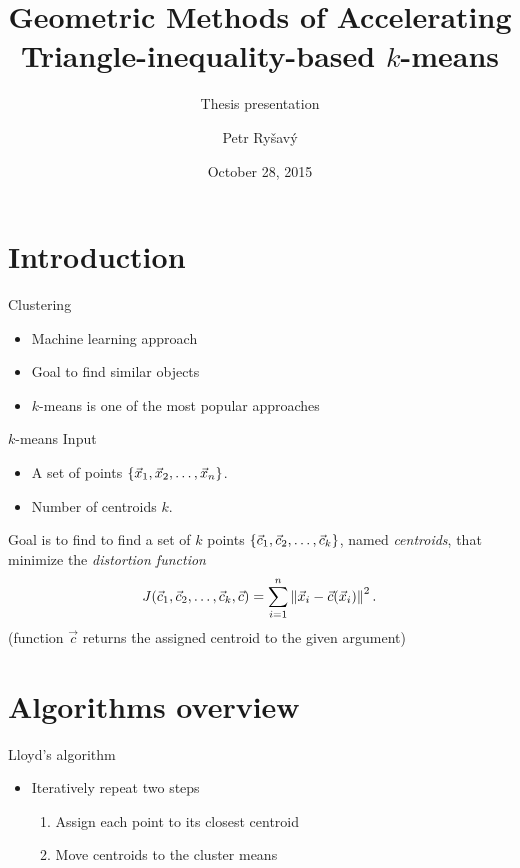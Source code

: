 \documentclass[10pt, compress]{beamer}
\title{Geometric Methods of Accelerating Triangle-inequality-based \texorpdfstring{$k$}{k}-means}
\subtitle{Thesis presentation}
\date{October 28, 2015}
\author{Petr Ry\v{s}av\'{y}}
\institute{Baylor University}
\begin{document}
\maketitle

\section{Introduction}

\begin{frame}{Clustering}
  \begin{itemize}
    \item Machine learning approach
    \item Goal to find similar objects
    \item $k$-means is one of the most popular approaches
  \end{itemize}
\end{frame}

\begin{frame}{\texorpdfstring{$k$}{k}-means}
  Input
  \begin{itemize}
    \item A set of points $\left\{ {\vec{x}}_1, {\vec{x}}_2, \ldots, {\vec{x}}_{n} \right\}$.
    \item Number of centroids $k$.
  \end{itemize}
  Goal is to find to find a set of $k$ points $\left\{ {\vec{c}}_1, {\vec{c}}_2, \ldots, {\vec{c}}_{k} \right\}$, named \emph{centroids},
  that minimize the \emph{distortion function}
  \begin{equation*}
    J({\vec{c}}_1, {\vec{c}}_2, \ldots, {\vec{c}}_{k}, \vec{c}) = \sum_{i=1}^n \left\| \vec{x}_i - \vec{c}(\vec{x}_i) \right\|^2.
    \label{eq:distortion}
  \end{equation*}
  (function $\vec{c}$ returns the assigned centroid to the given argument)
\end{frame}

\begin{frame}
  
\end{frame}

\section{Algorithms overview}

\begin{frame}{Lloyd's algorithm}
  \begin{itemize}
     \item Iteratively repeat two steps
     \begin{enumerate}
       \item Assign each point to its closest centroid
       \item Move centroids to the cluster means
     \end{enumerate}
  \end{itemize}
\end{frame}
\end{document}
